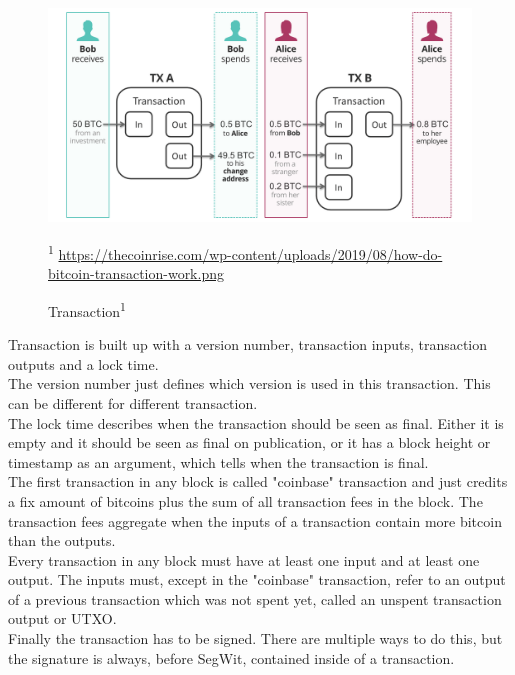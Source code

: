 \begin{figure}[!ht]
    \centering
    \includegraphics[width=(\textwidth / 2)]{Ausarbeitung/images/transaction.png}
    \caption[Transaction]{Transaction\textsuperscript{1}}
    \small\textsuperscript{1} \url{https://thecoinrise.com/wp-content/uploads/2019/08/how-do-bitcoin-transaction-work.png}
    \label{fig:transaction}
\end{figure}
Transaction is built up with a version number, transaction inputs, transaction outputs and a lock time. \\
The version number just defines which version is used in this transaction. This can be different for different transaction. \\
The lock time describes when the transaction should be seen as final. Either it is empty and it should be seen as final on publication, or it has a block height or timestamp as an argument, which tells when the transaction is final. \\
The first transaction in any block is called "coinbase" transaction and just credits a fix amount of bitcoins plus the sum of all transaction fees in the block. The transaction fees aggregate when the inputs of a transaction contain more bitcoin than the outputs. \\
Every transaction in any block must have at least one input and at least one output. The inputs must, except in the "coinbase" transaction, refer to an output of a previous transaction which was not spent yet, called an unspent transaction output or UTXO. \\
Finally the transaction has to be signed. There are multiple ways to do this, but the signature is always, before SegWit, contained inside of a transaction.


